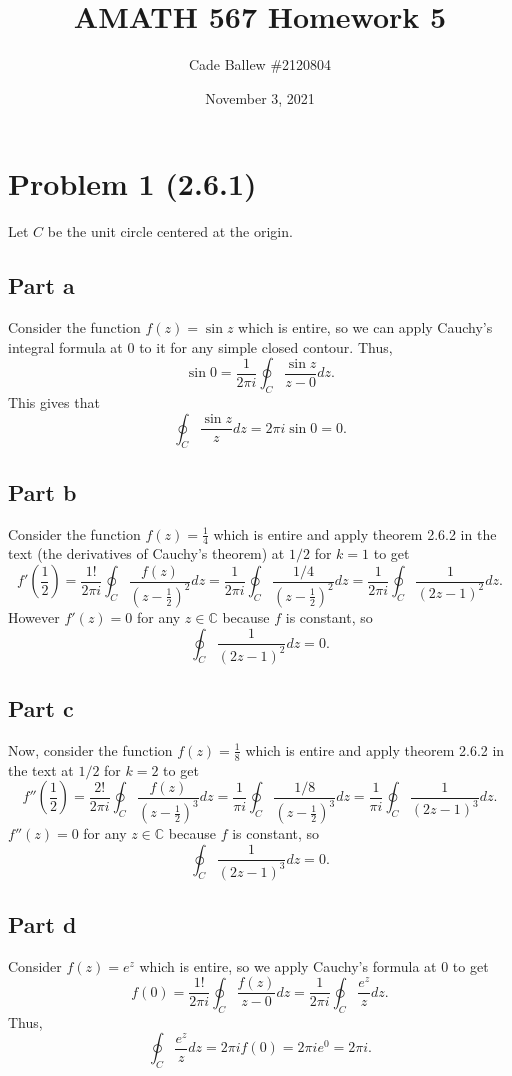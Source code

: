 \documentclass{article}
\title{AMATH 567 Homework 5}
\author{Cade Ballew \#2120804}
\date{November 3, 2021}
\begin{document}
\maketitle

\section{Problem 1 (2.6.1)}
Let $C$ be the unit circle centered at the origin. 
\subsection{Part a}
Consider the function $f(z)=\sin z$ which is entire, so we can apply Cauchy's integral formula at 0 to it for any simple closed contour. Thus,
\[
\sin{0}=\frac{1}{2\pi i}\oint_C\frac{\sin{z}}{z-0}dz.
\]
This gives that 
\[
\oint_C\frac{\sin{z}}{z}dz=2\pi i\sin{0}=0.
\]
\subsection{Part b}
Consider the function $f(z)=\frac{1}{4}$ which is entire and apply theorem 2.6.2 in the text (the derivatives of Cauchy's theorem) at $1/2$ for $k=1$ to get
\[
f'(\frac{1}{2})=\frac{1!}{2\pi i}\oint_C\frac{f(z)}{(z-\frac{1}{2})^2}dz=\frac{1}{2\pi i}\oint_C\frac{1/4}{(z-\frac{1}{2})^2}dz=\frac{1}{2\pi i}\oint_C\frac{1}{(2z-1)^2}dz.
\]
However $f'(z)=0$ for any $z\in\mathbb{C}$ because $f$ is constant, so
\[
\oint_C\frac{1}{(2z-1)^2}dz=0.
\]
\subsection{Part c}
Now, consider the function $f(z)=\frac{1}{8}$ which is entire and apply theorem 2.6.2 in the text at $1/2$ for $k=2$ to get
\[
f''(\frac{1}{2})=\frac{2!}{2\pi i}\oint_C\frac{f(z)}{(z-\frac{1}{2})^3}dz=\frac{1}{\pi i}\oint_C\frac{1/8}{(z-\frac{1}{2})^3}dz=\frac{1}{\pi i}\oint_C\frac{1}{(2z-1)^3}dz.
\]
$f''(z)=0$ for any $z\in\mathbb{C}$ because $f$ is constant, so
\[
\oint_C\frac{1}{(2z-1)^3}dz=0.
\]
\subsection{Part d}
Consider $f(z)=e^z$ which is entire, so we apply Cauchy's formula at 0 to get
\[
f(0)=\frac{1!}{2\pi i}\oint_C\frac{f(z)}{z-0}dz=\frac{1}{2\pi i}\oint_C\frac{e^z}{z}dz.
\]
Thus,
\[
\oint_C\frac{e^z}{z}dz=2\pi if(0)=2\pi ie^0=2\pi i.
\]
\end{document}
